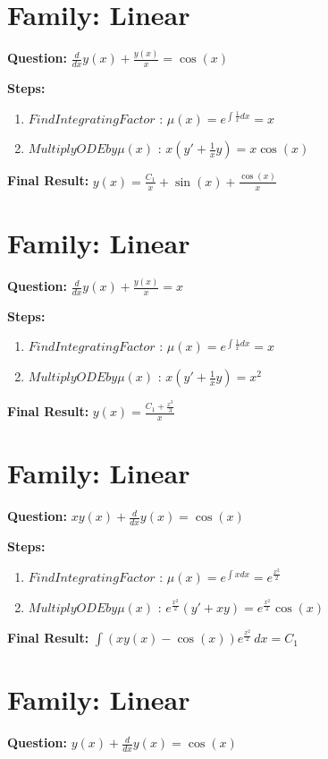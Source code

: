 \documentclass{article}
\begin{document}
\section*{Family: Linear}
\textbf{Question:} $\frac{d}{d x} y{\left(x \right)} + \frac{y{\left(x \right)}}{x} = \cos{\left(x \right)}$

\textbf{Steps:}
\begin{enumerate}
\item $Find Integrating Factor$ :  $\mu(x) = e^{\int \frac{1}{x} dx} = x$
\item $Multiply ODE by \mu(x)$ :  $x(y' + \frac{1}{x}y) = x \cos{\left(x \right)}$
\end{enumerate}
\textbf{Final Result:} $y{\left(x \right)} = \frac{C_{1}}{x} + \sin{\left(x \right)} + \frac{\cos{\left(x \right)}}{x}$

\section*{Family: Linear}
\textbf{Question:} $\frac{d}{d x} y{\left(x \right)} + \frac{y{\left(x \right)}}{x} = x$

\textbf{Steps:}
\begin{enumerate}
\item $Find Integrating Factor$ :  $\mu(x) = e^{\int \frac{1}{x} dx} = x$
\item $Multiply ODE by \mu(x)$ :  $x(y' + \frac{1}{x}y) = x^{2}$
\end{enumerate}
\textbf{Final Result:} $y{\left(x \right)} = \frac{C_{1} + \frac{x^{3}}{3}}{x}$

\section*{Family: Linear}
\textbf{Question:} $x y{\left(x \right)} + \frac{d}{d x} y{\left(x \right)} = \cos{\left(x \right)}$

\textbf{Steps:}
\begin{enumerate}
\item $Find Integrating Factor$ :  $\mu(x) = e^{\int x dx} = e^{\frac{x^{2}}{2}}$
\item $Multiply ODE by \mu(x)$ :  $e^{\frac{x^{2}}{2}}(y' + xy) = e^{\frac{x^{2}}{2}} \cos{\left(x \right)}$
\end{enumerate}
\textbf{Final Result:} $\int \left(x y{\left(x \right)} - \cos{\left(x \right)}\right) e^{\frac{x^{2}}{2}}\, dx = C_{1}$

\section*{Family: Linear}
\textbf{Question:} $y{\left(x \right)} + \frac{d}{d x} y{\left(x \right)} = \cos{\left(x \right)}$
\end{document}
